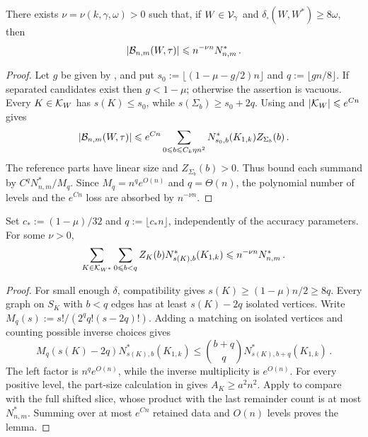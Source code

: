 \begin{lemma}\label{lemma:CompareBallsInCutMetricNlogNK1k}
There exists $\nu=\nu(k,\gamma,\omega)>0$ such that, if $W\in{\mathcal V}_\gamma$ and $\delta_\square(W,W^\ast)\geq8\omega$, then
$$|{\mathcal B}_{n,m}(W,\tau)|\leqslant n^{-\nu n}N^\ast_{n,m}\,.$$
\end{lemma}
\begin{proof}
Let $g$ be given by , and put $s_0:=\lfloor(1-\mu-g/2)n\rfloor$ and $q:=\lfloor gn/8\rfloor$. If separated candidates exist then $g<1-\mu$; otherwise the assertion is vacuous. Every $K\in{\mathcal K}_W$ has $s(K)\leq s_0$, while $s(\Sigma_b)\geq s_0+2q$. Using  and $|{\mathcal K}_W|\leqslant e^{Cn}$ gives
\begin{equation}\label{eqn:sub-comparison-start-K1k}
|{\mathcal B}_{n,m}(W,\tau)|\leqslant e^{Cn}\sum_{0\leqslant b\leqslant C_k\eta n^2}N^\ast_{s_0,b}(K_{1,k})Z_{\Sigma_b}(b)\,.
\end{equation}
The reference parts have linear size and $Z_{\Sigma_b}(b)>0$. Thus  bound each summand by $C^qN^\ast_{n,m}/M_q$. Since $M_q=n^{q}e^{O(n)}$ and $q=\Theta(n)$, the polynomial number of levels and the $e^{Cn}$ loss are absorbed by $n^{-\nu n}$.
\end{proof}

\begin{lemma}\label{lemma:sub-Wstar-sparse-lower-tail-K1k}
Set $c_\ast:=(1-\mu)/32$ and $q:=\lfloor c_\ast n\rfloor$, independently of the accuracy parameters. For some $\nu>0$,
$$\sum_{K\in{\mathcal K}_{W^\ast}}\sum_{0\leqslant b<q}Z_K(b)N^\ast_{s(K),b}(K_{1,k})\leqslant n^{-\nu n}N^\ast_{n,m}\,.$$
\end{lemma}
\begin{proof}
For small enough $\delta$, compatibility gives $s(K)\geq(1-\mu)n/2\geq8q$. Every graph on $S_K$ with $b<q$ edges has at least $s(K)-2q$ isolated vertices. Write $M_q(s):=s!/(2^qq!(s-2q)!)$. Adding a matching on isolated vertices and counting possible inverse choices gives
$$M_q(s(K)-2q)N^\ast_{s(K),b}(K_{1,k})\leq\binom{b+q}{q}N^\ast_{s(K),b+q}(K_{1,k})\,.$$
The left factor is $n^qe^{O(n)}$, while the inverse multiplicity is $e^{O(n)}$. For every positive level, the part-size calculation in  gives $A_K\geq a^2n^2$. Apply  to compare with the full shifted slice, whose product with the last remainder count is at most $N^\ast_{n,m}$. Summing over at most $e^{Cn}$ retained data and $O(n)$ levels proves the lemma.
\end{proof}

